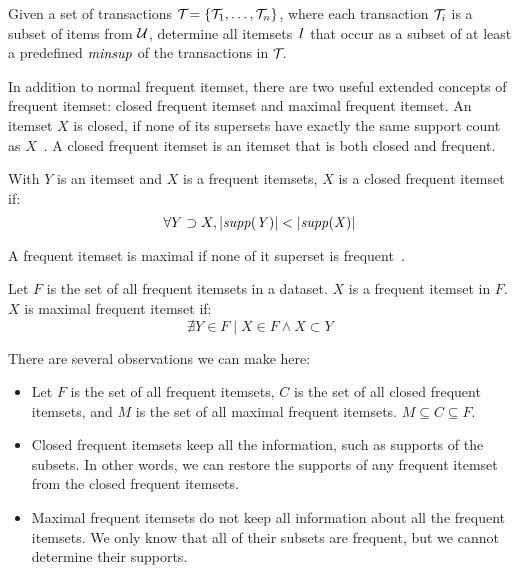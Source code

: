 \begin{definition}
    Given a set of transactions $\mathcal{T}_{} = \{\mathcal{T}_{1}, \dots, \mathcal{T}_{n}\}{}$, where each transaction $\mathcal{T}_{i}$ is a subset of items from $\mathcal{U}$, determine all itemsets $\mathit{I}$ that occur as a subset of at least a predefined $\mathit{minsup}$ of the transactions in $\mathcal{T}_{}$.
\end{definition}

In addition to normal frequent itemset, there are two useful extended concepts of frequent itemset: closed frequent itemset and maximal frequent itemset.
An itemset $X$ is closed, if none of its supersets have exactly the same support count as $X$~\cite{Aggarwal15}.
A closed frequent itemset is an itemset that is both closed and frequent.
\begin{definition}
    With $Y$ is an itemset and $X$ is a frequent itemsets, $X$ is a closed frequent itemset if:
    \begin{equation}
        \forall Y \supset X, \lvert \mathit{supp({Y})} \rvert < \lvert \mathit{supp({X})} \rvert
    \end{equation}
\end{definition}

A frequent itemset is maximal if none of it superset is frequent~\cite{Aggarwal15}.

\begin{definition}
    Let $F$ is the set of all frequent itemsets in a dataset. $X$ is a frequent itemset in $F$. $X$ is maximal frequent itemset if:
    \begin{equation}
        \nexists Y \in F \mid X \in F \wedge X \subset Y
    \end{equation}
\end{definition}

There are several observations we can make here:
\begin{itemize}
    \item Let $F$ is the set of all frequent itemsets, $C$ is the set of all closed frequent itemsets, and $M$ is the set of all maximal frequent itemsets. $M \subseteq C \subseteq F$.
    \item Closed frequent itemsets keep all the information, such as supports of the subsets. In other words, we can restore the supports of any frequent itemset from the closed frequent itemsets.
    \item Maximal frequent itemsets do not keep all information about all the frequent itemsets. We only know that all of their subsets are frequent, but we cannot determine their supports.
\end{itemize}

